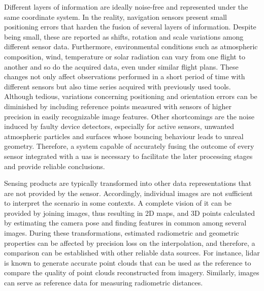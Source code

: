 Different layers of information are ideally noise-free and represented under the same coordinate system. In the reality, navigation sensors present small positioning errors that harden the fusion of several layers of information. Despite being small, these are reported as shifts, rotation and scale variations among different sensor data. Furthermore, environmental conditions such as atmospheric composition, wind, temperature or solar radiation can vary from one flight to another and so do the acquired data, even under similar flight plans. These changes not only affect observations performed in a short period of time with different sensors but also time series acquired with previously used tools. Although tedious, variations concerning positioning and orientation errors can be diminished by including reference points measured with sensors of higher precision in easily recognizable image features. Other shortcomings are the noise induced by faulty device detectors, especially for active sensors, unwanted atmospheric particles and surfaces whose bouncing behaviour leads to unreal geometry. Therefore, a system capable of accurately fusing the outcome of every sensor integrated with a \acrshort{uas} is necessary to facilitate the later processing stages and provide reliable conclusions. 

Sensing products are typically transformed into other data representations that are not provided by the sensor. Accordingly, individual images are not sufficient to interpret the scenario in some contexts. A complete vision of it can be provided by joining images, thus resulting in 2D maps, and 3D points calculated by estimating the camera pose and finding features in common among several images. During these transformations, estimated radiometric and geometric properties can be affected by precision loss on the interpolation, and therefore, a comparison can be established with other reliable data sources. For instance, \acrshort{lidar} is known to generate accurate point clouds that can be used as the reference to compare the quality of point clouds reconstructed from imagery. Similarly, images can serve as reference data for measuring radiometric distances.   

